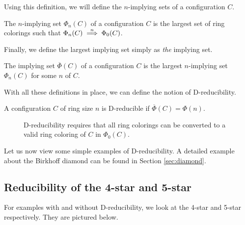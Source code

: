 Using this definition, we will define the $n$-implying sets of a configuration $C$.

\begin{definition}
    The $n$-implying set $\Phi_n(C)$ of a configuration $C$ is the largest set of ring colorings such that $\Phi_n(C) \stackrel{n}{\implies} \Phi_0(C)$.
\end{definition}

Finally, we define the largest implying set simply as \textit{the} implying set.

\begin{definition}
    The implying set $\overline{\Phi}(C)$ of a configuration $C$ is the largest $n$-implying set $\Phi_n(C)$ for some $n$ of $C$.
\end{definition}

With all these definitions in place, we can define the notion of D-reducibility.

\begin{definition}
    A configuration $C$ of ring size $n$ is D-reducible if $\overline{\Phi}(C) = \Phi(n)$.
\end{definition}

\begin{figure}[!h]
    \centering

    \caption{D-reducibility requires that all ring colorings can be converted to a valid ring coloring of $C$ in $\Phi_0(C)$.}
\end{figure}

Let us now view some simple examples of D-reducibility. A detailed example about the Birkhoff diamond can be found in Section \ref{sec:diamond}.

\subsection{Reducibility of the 4-star and 5-star}

For examples with and without D-reducibility, we look at the 4-star and 5-star respectively. They are pictured below.

